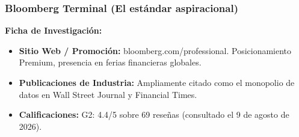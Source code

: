 \clearpage
\subsubsection{Bloomberg Terminal (El estándar aspiracional)}

\textbf{Ficha de Investigación:}
\begin{itemize}
    \item \textbf{Sitio Web / Promoción:} bloomberg.com/professional. Posicionamiento Premium, presencia en ferias financieras globales.
    \item \textbf{Publicaciones de Industria:} Ampliamente citado como el monopolio de datos en Wall Street Journal y Financial Times.
    \item \textbf{Calificaciones:} G2: 4.4/5 sobre 69 reseñas (consultado el 9 de agosto de 2026).
\end{itemize}
\vspace{0.35cm}

